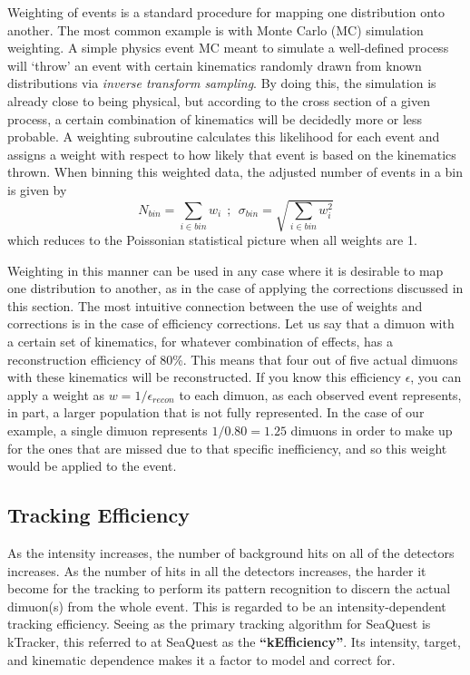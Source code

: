 Weighting of events is a standard procedure for mapping one distribution onto another. The most common example is with Monte Carlo (MC) simulation weighting. A simple physics event MC meant to simulate a well-defined process will `throw' an event with certain kinematics randomly drawn from known distributions via \emph{inverse transform sampling}. By doing this, the simulation is already close to being physical, but according to the cross section of a given process, a certain combination of kinematics will be decidedly more or less probable. A weighting subroutine calculates this likelihood for each event and assigns a weight with respect to how likely that event is based on the kinematics thrown. When binning this weighted data, the adjusted number of events in a bin is given by
\begin{equation}
	N_{bin} = \sum_{i \in bin} w_i\ \ ;\ \ \sigma_{bin} = \sqrt{\sum_{i\in bin} w_i^2}
	\label{eq:gmc-weight}
\end{equation}
which reduces to the Poissonian statistical picture when all weights are 1.

Weighting in this manner can be used in any case where it is desirable to map one distribution to another, as in the case of applying the corrections discussed in this section. The most intuitive connection between the use of weights and corrections is in the case of efficiency corrections. Let us say that a dimuon with a certain set of kinematics, for whatever combination of effects, has a reconstruction efficiency of 80\%. This means that four out of five actual dimuons with these kinematics will be reconstructed. If you know this efficiency $\epsilon$, you can apply a weight as $w = 1/\epsilon_{recon}$ to each dimuon, as each observed event represents, in part, a larger population that is not fully represented. In the case of our example, a single dimuon represents $1/0.80 = 1.25$ dimuons in order to make up for the ones that are missed due to that specific inefficiency, and so this weight would be applied to the event.

\subsection{Tracking Efficiency}\label{sec:keff}

As the intensity increases, the number of background hits on all of the detectors increases. As the number of hits in all the detectors increases, the harder it become for the tracking to perform its pattern recognition to discern the actual dimuon(s) from the whole event. This is regarded to be an intensity-dependent tracking efficiency. Seeing as the primary tracking algorithm for SeaQuest is kTracker, this referred to at SeaQuest as the \textbf{``kEfficiency''}. Its intensity, target, and kinematic dependence makes it a factor to model and correct for.

